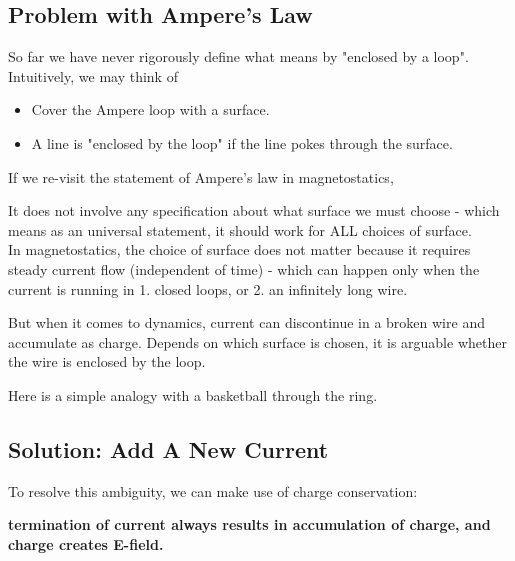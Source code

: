\documentclass[class=article, crop=false, 12pt]{standalone}
\begin{document}
\subsection{Problem with Ampere's Law}

So far we have never rigorously define what means by "enclosed by a loop".
Intuitively, we may think of 
\begin{itemize}
    \item Cover the Ampere loop with a surface.
    \item A line is "enclosed by the loop" if the line pokes through the surface.
\end{itemize}

If we re-visit the statement of Ampere's law in magnetostatics,

It does not involve any specification about what surface we must choose - 
which means as an universal statement, 
it should work for ALL choices of surface.\\

In magnetostatics, the choice of surface does not matter
because it requires steady current flow (independent of time) - 
which can happen only when the current is running in 1. closed loops, 
or 2. an infinitely long wire.


But when it comes to dynamics, 
current can discontinue in a broken wire and accumulate as charge.
Depends on which surface is chosen, 
it is arguable whether the wire is enclosed by the loop.


Here is a simple analogy with a basketball through the ring.



\subsection{Solution: Add A New Current}

To resolve this ambiguity, 
we can make use of charge conservation:

\bf{termination of current always results in accumulation of charge,
and charge creates E-field}. 
\end{document}
